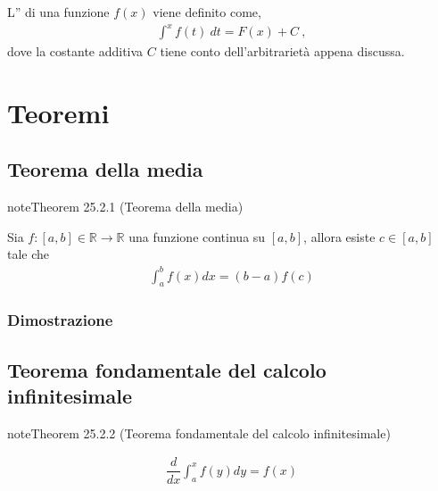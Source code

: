 \documentclass[letterpaper,10pt,italian]{jupyterBook}
\begin{document}
\sphinxAtStartPar
L” di una funzione \(f(x)\) viene definito come,
\begin{equation*}
\begin{split}\int^x f(t) \ dt = F(x) + C \ ,\end{split}
\end{equation*}
\sphinxAtStartPar
dove la costante additiva \(C\) tiene conto dell’arbitrarietà appena discussa.


\section{Teoremi}
\label{\detokenize{ch/infinitesimal_calculus/integrals:teoremi}}\label{\detokenize{ch/infinitesimal_calculus/integrals:infinitesimal-calculus-integrals-thm}}



\subsection{Teorema della media}
\label{\detokenize{ch/infinitesimal_calculus/integrals:teorema-della-media}}\label{\detokenize{ch/infinitesimal_calculus/integrals:infinitesimal-calculus-integrals-thm-avg}}\label{ch/infinitesimal_calculus/integrals:integrals:thm:avg}
\begin{sphinxadmonition}{note}{Theorem 25.2.1 (Teorema della media)}



\sphinxAtStartPar
Sia \(f: [a,b] \in \mathbb{R} \rightarrow \mathbb{R}\) una funzione continua su \([a,b]\), allora esiste \(c \in [a,b]\) tale che
\begin{equation*}
\begin{split}\int_{a}^{b} f(x) dx = (b-a) f(c) \end{split}
\end{equation*}\end{sphinxadmonition}
\subsubsection*{Dimostrazione}

\sphinxAtStartPar
{}




\subsection{Teorema fondamentale del calcolo infinitesimale}
\label{\detokenize{ch/infinitesimal_calculus/integrals:teorema-fondamentale-del-calcolo-infinitesimale}}\label{\detokenize{ch/infinitesimal_calculus/integrals:infinitesimal-calculus-integrals-thm-fund}}\label{ch/infinitesimal_calculus/integrals:integrals:thm:fund}
\begin{sphinxadmonition}{note}{Theorem 25.2.2 (Teorema fondamentale del calcolo infinitesimale)}


\begin{equation*}
\begin{split}\dfrac{d}{dx} \int_{a}^{x} f(y) dy = f(x) \end{split}
\end{equation*}\end{sphinxadmonition}
\end{document}
